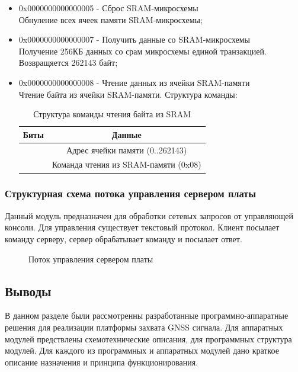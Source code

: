 \begin{itemize}
\item 0x0000000000000005 - Сброс SRAM-микросхемы \\ 
	Обнуление всех ячеек памяти SRAM-микросхемы;

\item 0x0000000000000007 - Получить данные со SRAM-микросхемы \\ 
	Получение 256КБ данных со срам микросхемы единой транзакцией. Возвращяется 262143 байт;

\item 0x0000000000000008 - Чтение данных из ячейки SRAM-памяти \\ 
	Чтение байта из ячейки SRAM-памяти. Структура команды:
	\begin{table}[H]
	\begin{center}
	\caption{Структура команды чтения байта из SRAM}
	\label{tab:read_sram}
	\begin{tabular}{|c|c|}
		\hline
			Биты & Данные \\
		\hline
			[25:08] & Адрес ячейки памяти (0..262143) \\
		\hline
			[07:00] & Команда чтения из SRAM-памяти (0x08) \\
		\hline
	\end{tabular}
	\end{center}
	\end{table}
\end{itemize}


\subsubsection*{Структурная схема потока управления сервером платы}
Данный модуль предназначен для обработки сетевых запросов от управляющей консоли. Для управления существует текстовый протокол.
Клиент посылает команду серверу, сервер обрабатывает команду и посылает ответ.

\begin{figure}[H]
\begin{center}
\end{center}
\caption{Поток управления сервером платы}
\label{pic:gui_server}
\end{figure}


\subsection*{Выводы}
В данном разделе были рассмотренны разработанные программно-аппаратные решения для реализации платформы захвата GNSS сигнала.
Для аппаратных модулей предствлены схемотехнические описания, для программных структура модулей. Для каждого из программных
и аппаратных модулей дано краткое описание назначения и принципа функционирования.

\newpage
